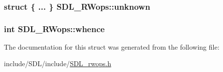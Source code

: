 \hypertarget{struct_s_d_l___r_wops_a5c2ef3288fcf78cc28f1b4b16b32eca1}{
\subsubsection[{unknown}]{\setlength{\rightskip}{0pt plus 5cm}struct \{ ... \}   S\-D\-L\-\_\-\-R\-Wops\-::unknown}}\label{struct_s_d_l___r_wops_a5c2ef3288fcf78cc28f1b4b16b32eca1}
\hypertarget{struct_s_d_l___r_wops_a95b96dcc6690897bfaf2d059f4378ed2}{
\subsubsection[{whence}]{ {\bf int} S\-D\-L\-\_\-\-R\-Wops\-::whence}}\label{struct_s_d_l___r_wops_a95b96dcc6690897bfaf2d059f4378ed2}


The documentation for this struct was generated from the following file\-:\begin{DoxyCompactItemize}
\item 
include/\-S\-D\-L/include/\hyperlink{_s_d_l__rwops_8h}{S\-D\-L\-\_\-rwops.\-h}\end{DoxyCompactItemize}
